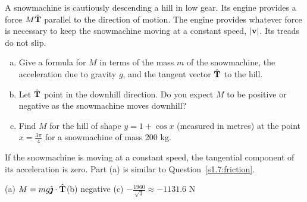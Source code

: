 \begin{question}
A snowmachine is cautiously descending a hill in low gear. Its engine provides a force $M\hat{\mathbf{T}}$ parallel to the direction of motion. The engine provides whatever force is necessary to keep the snowmachine moving at a constant speed, $|\mathbf{v}|$. Its treads do not slip.

\begin{enumerate}[(a)]
\item Give a formula for $M$ in terms of the mass $m$ of the snowmachine, the acceleration due to gravity $g$, and the tangent vector $\hat{\mathbf{T}}$ to the hill.
\item Let $\hat{\mathbf{T}}$ point in the downhill direction. Do you expect $M$ to be positive or negative as the snowmachine moves downhill?
\item Find $M$ for the hill of shape $y=1+\cos x$ (measured in metres) at the point $x=\frac{3\pi}{4}$ for a snowmachine of mass 200 kg.
\end{enumerate}

\end{question}
\begin{hint}
If the snowmachine is moving at a constant speed, the tangential component of its acceleration is zero. Part (a) is similar to Question~\ref{s1.7:friction}.
\end{hint}
\begin{answer}
(a) $M=mg \hat{\pmb{\jmath}} \cdot \hat{\mathbf{T}}$\qquad (b) negative \qquad (c) $-\frac{1960}{\sqrt 3} \approx - 1131.6$ N
\end{answer}
